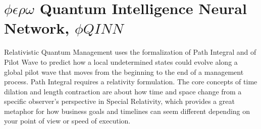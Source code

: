 \documentclass{article}
\begin{document}
\newpage
\section{$\phi \epsilon \rho \omega$ Quantum Intelligence Neural Network, $\phi QINN$}
\label{sec8}
Relativistic Quantum Management uses the formalization of Path Integral and of Pilot Wave to predict how a local undetermined states could evolve along a global pilot wave that moves from the beginning to the end of a management process. Path Integral requires a relativity formulation. The core concepts of time dilation and length contraction are about how time and space change from a specific observer's perspective in Special Relativity, which provides a great metaphor for how business goals and timelines can seem different depending on your point of view or speed of execution.
\end{document}
